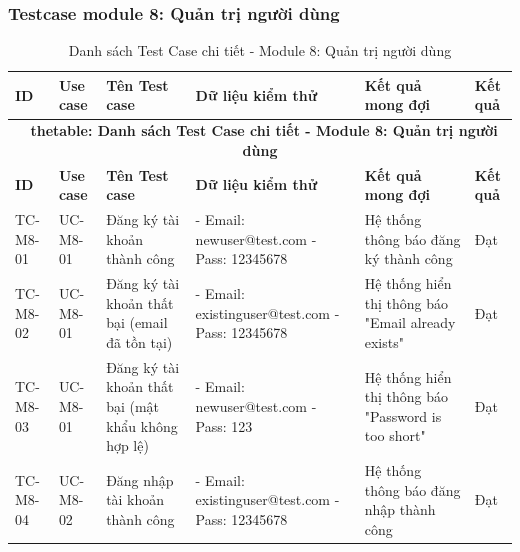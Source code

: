 \subsubsection{Testcase module 8: Quản trị người dùng}

\hypertarget{target:tc_m8}{}
\begin{landscape}
\small 
\begin{longtable}{|p{2.2cm}|p{2.2cm}|p{4cm}|p{4.5cm}|p{6cm}|p{2cm}|}
    
\caption{Danh sách Test Case chi tiết - Module 8: Quản trị người dùng} \label{tab:tc_module8} \\
\hline
\textbf{ID} & \textbf{ Use case} & \textbf{Tên Test case} & \textbf{Dữ liệu kiểm thử} & \textbf{Kết quả mong đợi} & \textbf{Kết quả } \\
\hline
\endfirsthead

\multicolumn{6}{c}{{\bfseries \tablename\ thetable{}: Danh sách Test Case chi tiết - Module 8: Quản trị người dùng}} \\
\hline
\textbf{ID} & \textbf{ Use case} & \textbf{Tên Test case} & \textbf{Dữ liệu kiểm thử} & \textbf{Kết quả mong đợi} & \textbf{Kết quả } \\
\hline
\endhead

\hline
\endlastfoot


TC-M8-01 & UC-M8-01 & Đăng ký tài khoản thành công & 
- Email: newuser@test.com \newline 
- Pass: 12345678 & 
Hệ thống thông báo đăng ký thành công & Đạt\\
\hline

TC-M8-02 & UC-M8-01 & Đăng ký tài khoản thất bại (email đã tồn tại) & 
- Email: existinguser@test.com \newline 
- Pass: 12345678 & 
Hệ thống hiển thị thông báo "Email already exists" & Đạt \\
\hline

TC-M8-03 & UC-M8-01 & Đăng ký tài khoản thất bại (mật khẩu không hợp lệ) & 
- Email: newuser@test.com \newline 
- Pass: 123 & 
Hệ thống hiển thị thông báo "Password is too short" & Đạt \\
\hline

TC-M8-04 & UC-M8-02 & Đăng nhập tài khoản thành công & 
- Email: existinguser@test.com \newline 
- Pass: 12345678 & 
Hệ thống thông báo đăng nhập thành công & Đạt \\
\hline


\end{longtable}
\end{landscape}
